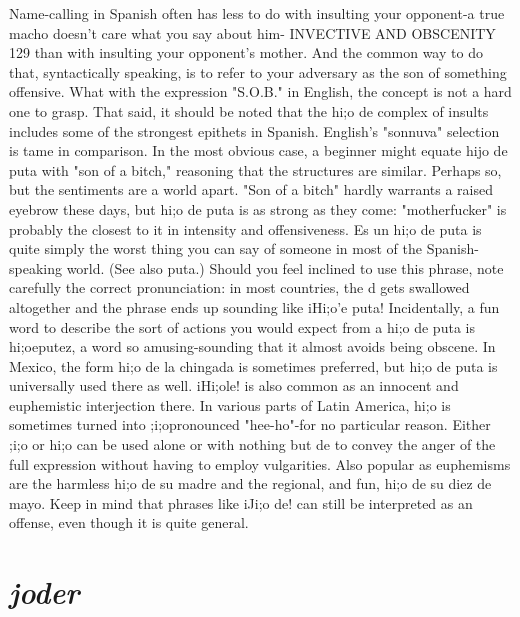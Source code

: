 \documentclass[14pt,a4paper,oneside]{memoir}
\begin{document}
Name-calling in Spanish often has less to do with insulting
your opponent-a true macho doesn't care what you say about him-
INVECTIVE AND OBSCENITY 129
than with insulting your opponent's mother. And the common way to
do that, syntactically speaking, is to refer to your adversary as the son
of something offensive. What with the expression "S.O.B." in English,
the concept is not a hard one to grasp.
That said, it should be noted that the hi;o de complex of insults includes some of the strongest epithets in Spanish. English's
"sonnuva" selection is tame in comparison. In the most obvious case,
a beginner might equate hijo de puta with "son of a bitch," reasoning
that the structures are similar. Perhaps so, but the sentiments are a
world apart. "Son of a bitch" hardly warrants a raised eyebrow these
days, but hi;o de puta is as strong as they come: "motherfucker" is
probably the closest to it in intensity and offensiveness. Es un hi;o de
puta is quite simply the worst thing you can say of someone in most of
the Spanish-speaking world. (See also puta.) Should you feel inclined
to use this phrase, note carefully the correct pronunciation: in most
countries, the d gets swallowed altogether and the phrase ends up sounding like iHi;o'e puta! Incidentally, a fun word to describe the sort of
actions you would expect from a hi;o de puta is hi;oeputez, a word so
amusing-sounding that it almost avoids being obscene.
In Mexico, the form hi;o de la chingada is sometimes preferred, but hi;o de puta is universally used there as well. iHi;ole! is
also common as an innocent and euphemistic interjection there. In
various parts of Latin America, hi;o is sometimes turned into ;i;opronounced "hee-ho"-for no particular reason. Either ;i;o or hi;o can
be used alone or with nothing but de to convey the anger of the full
expression without having to employ vulgarities. Also popular as euphemisms are the harmless hi;o de su madre and the regional, and fun,
hi;o de su diez de mayo. Keep in mind that phrases like iJi;o de! can
still be interpreted as an offense, even though it is quite general.

\section{\emph{joder}}
\end{document}
